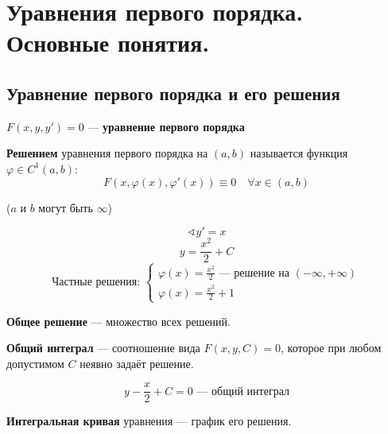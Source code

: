 
\section{Уравнения первого порядка. Основные понятия.}

\subsection{Уравнение первого порядка и его решения}

\begin{definition}
    $F(x, y, y')=0$ --- \textbf{уравнение первого порядка}
\end{definition}

\begin{definition}
    \textbf{Решением} уравнения первого порядка на $(a,b)$ называется функция $\varphi \in C^1(a,b)$:
    $$F(x, \varphi(x), \varphi'(x)) \equiv 0 \quad \forall x\in(a,b)$$

    ($a$ и $b$ могут быть $\infty$)
\end{definition}

\begin{example}
    $$\sphericalangle y'=x$$
    $$y = \frac{x^2}{2} + C$$
    $$\text{Частные решения: } \begin{cases}
            \varphi(x) = \frac{x^2}{2} \text{ --- решение на } (-\infty, +\infty) \\
            \varphi(x) = \frac{x^2}{2} + 1
        \end{cases}$$
\end{example}

\begin{definition}
    \textbf{Общее решение} --- множество всех решений.
\end{definition}

\begin{definition}
    \textbf{Общий интеграл} --- соотношение вида $F(x, y, C) = 0$, которое при любом допустимом $C$ неявно задаёт решение.
\end{definition}

\begin{example}
    $$y - \frac{x}{2} + C = 0 \text{ --- общий интеграл}$$
\end{example}

\begin{definition}
    \textbf{Интегральная кривая} уравнения --- график его решения.
\end{definition}

